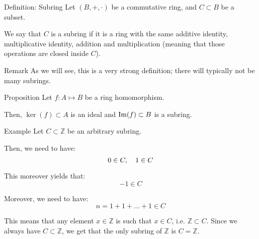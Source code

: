 \documentclass[a4paper]{article}
\begin{document}
\begin{parag}{Definition: Subring}
    Let $\left(B, +, \cdot \right)$ be a commutative ring, and $C \subset B$ be a subset.

    We say that $C$ is a subring if it is a ring with the same additive identity, multiplicative identity, addition and multiplication (meaning that those operations are closed inside $C$).

    \begin{subparag}{Remark}
        As we will see, this is a very strong definition; there will typically not be many subrings.
    \end{subparag}
\end{parag}

\begin{parag}{Proposition}
    Let $f: A \mapsto B$ be a ring homomorphism.

    Then, $\ker\left(f\right) \subset A$ is an ideal and $\im\left(f\right) \subset B$ is a subring.
\end{parag}

\begin{parag}{Example}
    Let $C \subset \mathbb{Z}$ be an arbitrary subring. 

    Then, we need to have: 
    \[0 \in C, \quad 1 \in C\]

    This moreover yields that: 
    \[-1 \in C\]
    
    Moreover, we need to have: 
    \[n = 1 + 1 + \ldots + 1 \in C\]
    
    This means that any element $x \in \mathbb{Z}$ is such that $x \in C$, i.e. $\mathbb{Z} \subset C$. Since we always have $C \subset \mathbb{Z}$, we get that the only subring of $\mathbb{Z}$ is $C = \mathbb{Z}$.
\end{parag}
\end{document}
